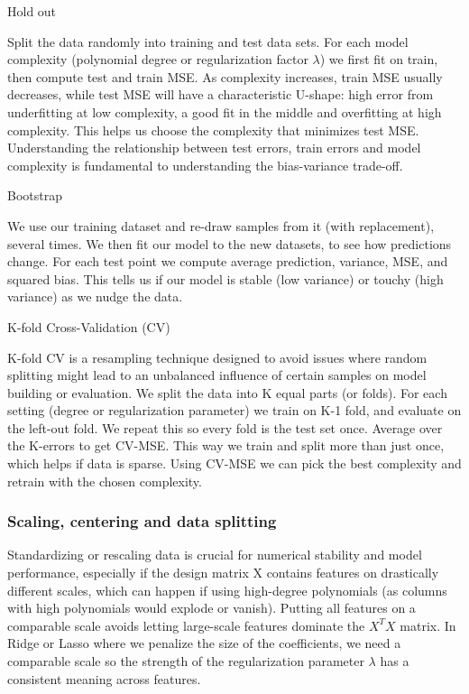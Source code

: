 \documentclass[amssymb,twocolumn,aps]{revtex4-2}
\begin{document}
{Hold out}

Split the data randomly into training and test data sets. For each model complexity (polynomial degree or regularization factor $\lambda$) we first fit on train, then compute test and train MSE. As complexity increases, train MSE usually decreases, while test MSE will have a characteristic U-shape: high error from underfitting at low complexity, a good fit in the middle and overfitting at high complexity. This helps us choose the complexity that minimizes test MSE. Understanding the relationship between test errors, train errors and model complexity is fundamental to understanding the bias-variance trade-off. 

{Bootstrap}

We use our training dataset and re-draw samples from it (with replacement), several times. We then fit our model to the new datasets, to see how predictions change. For each test point we compute average prediction, variance, MSE, and squared bias. This tells us if our model is stable (low variance) or touchy (high variance) as we nudge the data. 

{K-fold Cross-Validation (CV)}

K-fold CV is a resampling technique designed to avoid issues where random splitting might lead to an unbalanced influence of certain samples on model building or evaluation. We split the data into K equal parts (or folds). For each setting (degree or regularization parameter) we train on K-1 fold, and evaluate on the left-out fold. We repeat this so every fold is the test set once. Average over the K-errors to get CV-MSE. This way we train and split more than just once, which helps if data is sparse. Using CV-MSE we can pick the best complexity and retrain with the chosen complexity.  

\subsubsection{Scaling, centering and data splitting}
\label{subsubsec:scal_theory}

Standardizing or rescaling data is crucial for numerical stability and model performance, especially if the design matrix X contains features on drastically different scales, which can happen if using high-degree polynomials (as columns with high polynomials would explode or vanish). Putting all features on a comparable scale avoids letting large-scale features dominate the $X^TX$ matrix. In Ridge or Lasso where we penalize the size of the coefficients, we need a comparable scale so the strength of the regularization parameter $\lambda$ has a consistent meaning across features. \\
\end{document}
